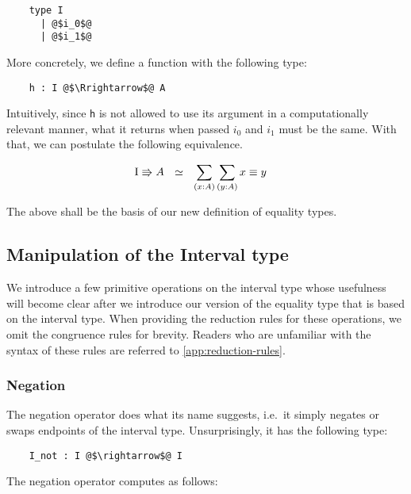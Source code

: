 \documentclass[12pt,twoside,maitrise]{dms}
\theoremstyle{definition}
\numberwithin{equation}{section}
\numberwithin{table}{chapter}
\numberwithin{figure}{chapter}
\newcommand\id[1] {\texttt{#1}}
\begin{document}
\begin{verbatim}
    type I
      | @$i_0$@
      | @$i_1$@
\end{verbatim}

More concretely, we define a function with the following type:

\begin{verbatim}
    h : I @$\Rrightarrow$@ A
\end{verbatim}

Intuitively, since \id{h} is not allowed to use its argument in a
computationally relevant manner, what it returns when passed $i_0$ and $i_1$
must be the same. With that, we can postulate the following equivalence.

\begin{align*}
  & \bI \Rrightarrow A \ \ \simeq \ \ \sum\limits_{(\oftype{x}{A})} \sum\limits_{(\oftype{y}{A})} \eqtype{x}{y}\nonumber
\end{align*}

The above shall be the basis of our new definition of equality types.

\subsection{Manipulation of the Interval type}\label{sec:interval-manipulation}

We introduce a few primitive operations on the interval type whose usefulness
will become clear after we introduce our version of the equality type that is
based on the interval type. When providing the reduction rules for these
operations, we omit the congruence rules for brevity. Readers who are
unfamiliar with the syntax of these rules are referred to
\autoref{app:reduction-rules}.

\subsubsection*{Negation}

The negation operator does what its name suggests, i.e.\ it simply negates or
swaps endpoints of the interval type. Unsurprisingly, it has the following type:

\begin{verbatim}
    I_not : I @$\rightarrow$@ I
\end{verbatim}

The negation operator computes as follows:
\end{document}
